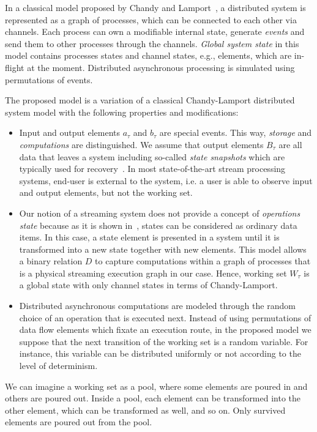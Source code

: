 In a classical model proposed by Chandy and Lamport~\cite{Chandy:1985:DSD:214451.214456}, a distributed system is represented as a graph of processes, which can be connected to each other via channels. Each process can own a modifiable internal state, generate {\em events} and send them to other processes through the channels. {\em Global system state} in this model contains processes states and channel states, e.g., elements, which are in-flight at the moment. Distributed asynchronous processing is simulated using permutations of events.

The proposed model is a variation of a classical Chandy-Lamport distributed system model with the following properties and modifications:

\begin{itemize}
    \item Input and output elements $a_\tau$ and $b_\tau$ are special events. This way, {\em storage} and {\em computations} are distinguished. We assume that output elements $B_\tau$ are all data that leaves a system including so-called {\em state snapshots} which are typically used for recovery~\cite{Carbone:2017:SMA:3137765.3137777}. In most state-of-the-art stream processing systems, end-user is external to the system, i.e. a user is able to observe input and output elements, but not the working set.
    \item Our notion of a streaming system does not provide a concept of {\em operations state} because as it is shown in~\cite{we2018adbis}, states can be considered as ordinary data items. In this case, a state element is presented in a system until it is transformed into a new state together with new elements. This model allows a binary relation $D$ to capture computations within a graph of processes that is a physical streaming execution graph in our case. Hence, working set $W_\tau$ is a global state with only channel states in terms of Chandy-Lamport.
    \item Distributed asynchronous computations are modeled through the random choice of an operation that is executed next. Instead of using permutations of data flow elements which fixate an execution route, in the proposed model we suppose that the next transition of the working set is a random variable. For instance, this variable can be distributed uniformly or not according to the level of determinism. 
\end{itemize}

We can imagine a working set as a pool, where some elements are poured in and others are poured out. Inside a pool, each element can be transformed into the other element, which can be transformed as well, and so on. Only survived elements are poured out from the pool. 

